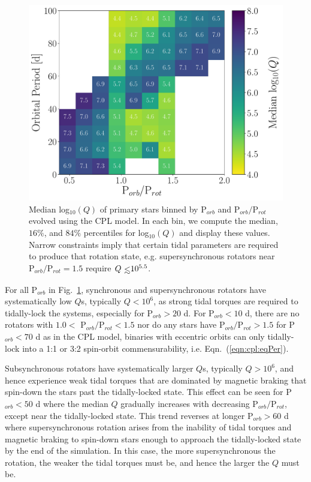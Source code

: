 \documentclass[twocolumn]{aastex61}
\def\lsim{~\rlap{$<$}{\lower 1.0ex\hbox{$\sim$}}}
\begin{document}
\begin{figure}
	\includegraphics[width=\textwidth]{../Plots/porbProtPorbQHist.pdf}
   \caption{Median log$_{10}(Q)$ of primary stars binned by P$_{orb}$ and P$_{orb}/$P$_{rot}$ evolved using the CPL model.  In each bin, we compute the median, $16\%$, and $84\%$ percentiles for log$_{10}(Q)$ and display these values. Narrow constraints imply that certain tidal parameters are required to produce that rotation state, e.g. supersynchronous rotators near P$_{orb}/$P$_{rot} = 1.5$ require $Q \lsim 10^{5.5}$. }%
    \label{fig:qmap}%
\end{figure}

For all P$_{orb}$ in Fig.~\ref{fig:qmap}, synchronous and supersynchronous rotators have systematically low $Q$s, typically $Q < 10^6$, as strong tidal torques are required to tidally-lock the systems, especially for P$_{orb} > 20$ d. For P$_{orb} < 10$ d, there are no rotators with $1.0 <$ P$_{orb}/$P$_{rot} < 1.5$ nor do any stars have P$_{orb}/$P$_{rot} > 1.5$ for P$_{orb} < 70$ d as in the CPL model, binaries with eccentric orbits can only tidally-lock into a 1:1 or 3:2 spin-orbit commensurability, i.e. Eqn.~(\ref{eqn:cpl:eqPer}).   

Subsynchronous rotators have systematically larger $Q$s, typically $Q > 10^6$, and hence experience weak tidal torques that are dominated by magnetic braking that spin-down the stars past the tidally-locked state.  This effect can be seen for P$_{orb} < 50$ d where the median $Q$ gradually increases with decreasing P$_{orb}/$P$_{rot}$, except near the tidally-locked state.  This trend reverses at longer P$_{orb} > 60$ d where supersynchronous rotation arises from the inability of tidal torques and magnetic braking to spin-down stars enough to approach the tidally-locked state by the end of the simulation.  In this case, the more supersynchronous the rotation, the weaker the tidal torques must be, and hence the larger the $Q$ must be. 
\end{document}
